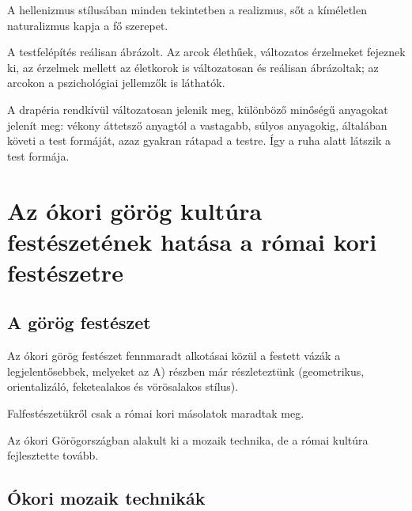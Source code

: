 	A hellenizmus stílusában minden tekintetben a realizmus, sőt a kíméletlen naturalizmus kapja a fő szerepet.	
	
	A testfelépítés reálisan ábrázolt. Az arcok élethűek, változatos érzelmeket fejeznek ki, az érzelmek mellett az életkorok is változatosan és reálisan ábrázoltak; az arcokon a pszichológiai jellemzők is láthatók.
	
	A drapéria rendkívül változatosan jelenik meg, különböző minőségű anyagokat jelenít meg: vékony áttetsző anyagtól a vastagabb, súlyos anyagokig, általában követi a test formáját, azaz gyakran rátapad a testre. Így a ruha alatt látszik a test formája.

\cleardoublepage

\section{Az ókori görög kultúra festészetének hatása a római kori festészetre}


\subsection*{A görög festészet}

Az ókori görög festészet fennmaradt alkotásai közül a festett vázák a legjelentősebbek, melyeket az A) részben már részleteztünk (geometrikus, orientalizáló, feketealakos és vörösalakos stílus).

 Falfestészetükről csak a római kori másolatok maradtak meg.

Az ókori Görögországban alakult ki a mozaik technika, de a római kultúra fejlesztette tovább.

\subsection*{Ókori mozaik technikák}


